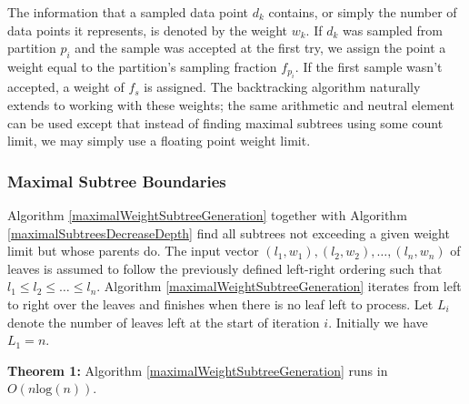 \documentclass{report}
\begin{document}
	
 The information that a sampled data point $d_k$ contains, or simply the number of data points it represents, is denoted by the weight $w_k$.
 If  $d_k$ was sampled from partition $p_i$ and the sample was accepted at the first try, we assign the point a weight equal to the partition's sampling fraction $f_{p_i}$. If the first sample wasn't
	accepted, a weight of $f_s$ is assigned. The backtracking algorithm naturally extends to 
	working with these weights; the same arithmetic and neutral element can be used except that instead of finding maximal subtrees using some count limit, we may simply use a floating point weight limit.


\subsubsection{Maximal Subtree Boundaries}

	Algorithm \ref{maximalWeightSubtreeGeneration} together with Algorithm \ref{maximalSubtreesDecreaseDepth} 
	find all subtrees not exceeding a given weight limit but whose parents do.
	The input vector $(l_1, w_1), (l_2, w_2), \dots, (l_n,w_n)$ of leaves is assumed to follow the previously defined left-right ordering such that $l_1 \leq l_2 \leq \dots \leq l_n$. 
	Algorithm \ref{maximalWeightSubtreeGeneration} iterates from left to right over the leaves and finishes when there is no leaf left to process. Let $L_i$ denote the number of leaves 
	left at the start of iteration $i$. Initially we have $L_1 = n$. \newline


\noindent\textbf{Theorem 1: }Algorithm \ref{maximalWeightSubtreeGeneration} runs in $O(n\text{log}(n))$.\newline
\end{document}
